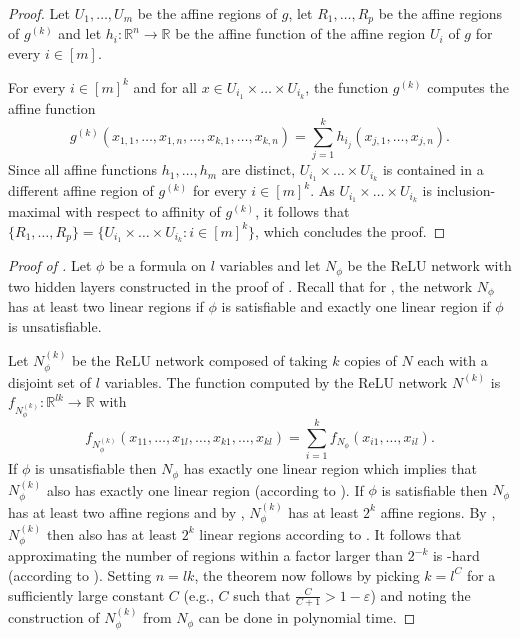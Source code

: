 \documentclass{article}
\begin{document}
\begin{proof}
Let $U_1,\dots,U_m$ be the affine regions of $g$, let $R_1,\dots, R_p$ be the affine regions of $g^{(k)}$ and let $h_i:\mathbb{R}^{n}\to \mathbb{R}$ be the affine function of the affine region $U_i$ of $g$ for every $i\in [m]$.

For every $i\in [m]^k$ and for all $x\in U_{i_1}\times \dots \times U_{i_k}$, the function $g^{(k)}$ computes the affine function
\[
g^{(k)}(x_{1,1},\dots, x_{1,n},\dots,x_{k,1},\dots, x_{k,n})=\sum_{j=1}^k h_{i_j}(x_{j,1},\dots, x_{j,n}).
\]
Since all affine functions $h_1,\dots,h_m$ are distinct, $U_{i_1}\times \dots \times U_{i_k}$ is contained in a different affine region of $g^{(k)}$ for every $i\in [m]^k$.
As $U_{i_1}\times \dots \times U_{i_k}$ is inclusion-maximal with respect to affinity of $g^{(k)}$, it follows that $\{R_1,\dots,R_p\} = \{U_{i_1}\times \dots \times U_{i_k}: i\in [m]^k\}$, which concludes the proof.
\end{proof}
\begin{proof}[Proof of ]
Let $\phi$ be a \SAT{} formula on $l$ variables and let $N_\phi$ be the ReLU network with two hidden layers constructed in the proof of . Recall that for , the network $N_\phi$ has at least two linear regions if $\phi$ is satisfiable and exactly one linear region if $\phi$ is unsatisfiable.

Let $N_\phi^{(k)}$ be the ReLU network composed of taking $k$ copies of $N$ each with a disjoint set of $l$ variables.
The function computed by the ReLU network $N^{(k)}$ is $f_{N_\phi^{(k)}}:\mathbb{R}^{lk}\to \mathbb{R}$ with
\[
f_{N_\phi^{(k)}}(x_{11},\dots, x_{1l},\dots,x_{k1},\dots, x_{kl})=\sum_{i=1}^k f_{N_\phi}(x_{i1},\dots, x_{il}).
\]
If $\phi$ is unsatisfiable then $N_\phi$ has exactly one linear region which implies that $N_\phi^{(k)}$ also has exactly one linear region (according to ). If $\phi$ is satisfiable then $N_\phi$ has at least two affine regions and by , $N_\phi^{(k)}$ has at least $2^k$ affine regions. By , $N_\phi^{(k)}$ then also has at least $2^k$ linear regions according to .
It follows that approximating the number of regions within a factor larger than $2^{-k}$ is \NP-hard (according to ). Setting $n=lk$, the theorem now follows by picking $k=l^C$ for a sufficiently large constant $C$ (e.g., $C$ such that $\frac{C}{C+1}>1-\varepsilon$) and noting the construction of $N_\phi^{(k)}$ from $N_\phi$ can be done in polynomial time.
\end{proof}
\end{document}
